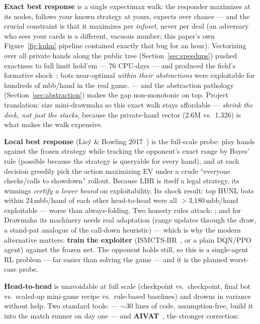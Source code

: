 \textbf{Exact best response} is a single expectimax walk: the responder maximizes at its nodes, follows your known strategy at yours, expects over chance --- and the crucial constraint is that it maximizes per \emph{infoset}, never per deal (an adversary who sees your cards is a different, vacuous number; this paper's own Figure~\ref{fig:kuhn} pipeline contained exactly that bug for an hour). Vectorizing over all private hands along the public tree (Section~\ref{sec:speedups}) pushed exactness to full limit hold'em --- 76 CPU-days --- and produced the field's formative shock~\cite{johanson2011}: bots near-optimal \emph{within their abstractions} were exploitable for hundreds of mbb/hand in the real game.  --- and the abstraction pathology (Section~\ref{sec:abstraction}) makes the gap non-monotonic on top. Project translation: size mini-drawmaha so this exact walk stays affordable --- \emph{shrink the deck, not just the stacks}, because the private-hand vector (2.6M vs.\ 1{,}326) is what makes the walk expensive.

\textbf{Local best response} (Lis\'y \& Bowling 2017~\cite{lbr}) is the full-scale probe: play hands against the frozen strategy while tracking the opponent's exact range by Bayes' rule (possible because the strategy is queryable for every hand), and at each decision greedily pick the action maximizing EV under a crude ``everyone checks/calls to showdown'' rollout. Because LBR is itself a legal strategy, its winnings \emph{certify a lower bound} on exploitability. Its shock result: top HUNL bots within 24\,mbb/hand of each other head-to-head were all $>$3{,}180\,mbb/hand exploitable --- worse than always-folding. Two honesty rules attach: ; and for Drawmaha its machinery needs real adaptation (range updates through the draw, a stand-pat analogue of the call-down heuristic) --- which is why the modern alternative matters: \textbf{train the exploiter} (ISMCTS-BR~\cite{timbers2022}, or a plain DQN/PPO agent) against the frozen net. The opponent holds still, so this is a single-agent RL problem --- far easier than solving the game --- and it is the planned worst-case probe.

\textbf{Head-to-head} is unavoidable at full scale (checkpoint vs.\ checkpoint, final bot vs.\ scaled-up mini-game recipe vs.\ rule-based baselines) and drowns in variance without help. Two standard tools:  --- $\sim$30 lines of code, assumption-free, build it into the match runner on day one --- and \textbf{AIVAT}~\cite{aivat}, the stronger correction:

